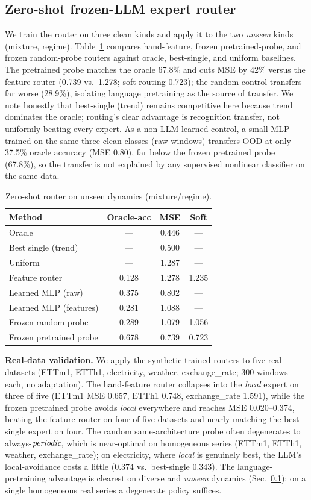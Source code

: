 \documentclass{article}
\begin{document}
\subsection{Zero-shot frozen-LLM expert router}\label{sec:e4}
We train the router on three clean kinds and apply it to the two \emph{unseen}
kinds (mixture, regime).  Table~\ref{tab:router} compares hand-feature, frozen
pretrained-probe, and frozen random-probe routers against oracle, best-single,
and uniform baselines.  The pretrained probe matches the oracle 67.8\% and cuts
MSE by 42\% versus the feature router (0.739 vs.\ 1.278; soft routing 0.723);
the random control transfers far worse (28.9\%), isolating language pretraining
as the source of transfer.  We note honestly that best-single (trend) remains
competitive here because trend dominates the oracle; routing's clear advantage
is recognition transfer, not uniformly beating every expert.  As a non-LLM
learned control, a small MLP trained on the same three clean classes (raw
windows) transfers OOD at only 37.5\% oracle accuracy (MSE 0.80), far below the
frozen pretrained probe (67.8\%), so the transfer is not explained by any
supervised nonlinear classifier on the same data.

\begin{table}[t]
\caption{Zero-shot router on unseen dynamics (mixture/regime).}
\label{tab:router}
\centering
\begin{tabular}{lccc}
\toprule
Method & Oracle-acc & MSE & Soft\\
\midrule
Oracle & --- & 0.446 & ---\\
Best single (trend) & --- & 0.500 & ---\\
Uniform & --- & 1.287 & ---\\
Feature router & 0.128 & 1.278 & 1.235\\
Learned MLP (raw) & 0.375 & 0.802 & ---\\
Learned MLP (features) & 0.281 & 1.088 & ---\\
Frozen random probe & 0.289 & 1.079 & 1.056\\
Frozen pretrained probe & 0.678 & 0.739 & 0.723\\
\bottomrule
\end{tabular}
\end{table}

\textbf{Real-data validation.}  We apply the synthetic-trained routers to five
real datasets (ETTm1, ETTh1, electricity, weather, exchange\_rate; 300 windows
each, no adaptation).  The hand-feature router collapses into the \emph{local}
expert on three of five (ETTm1 MSE 0.657, ETTh1 0.748, exchange\_rate 1.591),
while the frozen pretrained probe avoids \emph{local} everywhere and reaches
MSE 0.020--0.374, beating the feature router on four of five datasets and
nearly matching the best single expert on four.  The random same-architecture
probe often degenerates to always-$\emph{periodic}$, which is near-optimal on
homogeneous series (ETTm1, ETTh1, weather, exchange\_rate); on electricity,
where \emph{local} is genuinely best, the LLM's local-avoidance costs a little
(0.374 vs.\ best-single 0.343).  The language-pretraining advantage is clearest
on diverse and \emph{unseen} dynamics (Sec.~\ref{sec:e4}); on a single
homogeneous real series a degenerate policy suffices.
\end{document}
